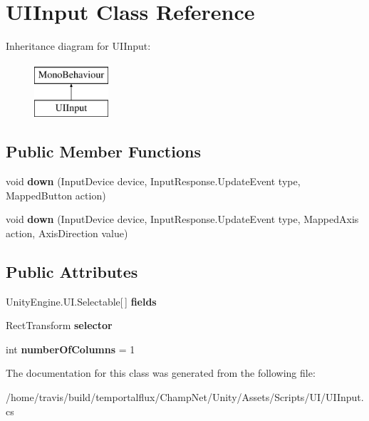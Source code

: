 \hypertarget{class_u_i_input}{\section{U\-I\-Input Class Reference}
\label{class_u_i_input}
}
Inheritance diagram for U\-I\-Input\-:\begin{figure}[H]
\begin{center}
\leavevmode
\includegraphics[height=2.000000cm]{class_u_i_input}
\end{center}
\end{figure}
\subsection*{Public Member Functions}
\begin{DoxyCompactItemize}
\item 
\hypertarget{class_u_i_input_a03c28ad604ce9277ecd348a65704a0a8}{void {\bfseries down} (Input\-Device device, Input\-Response.\-Update\-Event type, Mapped\-Button action)}\label{class_u_i_input_a03c28ad604ce9277ecd348a65704a0a8}

\item 
\hypertarget{class_u_i_input_a9382a2e9ef24947e760e2f28893ac225}{void {\bfseries down} (Input\-Device device, Input\-Response.\-Update\-Event type, Mapped\-Axis action, Axis\-Direction value)}\label{class_u_i_input_a9382a2e9ef24947e760e2f28893ac225}

\end{DoxyCompactItemize}
\subsection*{Public Attributes}
\begin{DoxyCompactItemize}
\item 
\hypertarget{class_u_i_input_a01f1f252f9f819fc1755e0ead2f433c9}{Unity\-Engine.\-U\-I.\-Selectable\mbox{[}$\,$\mbox{]} {\bfseries fields}}\label{class_u_i_input_a01f1f252f9f819fc1755e0ead2f433c9}

\item 
\hypertarget{class_u_i_input_a1e6f61613450b2a3f604558b864dd5fd}{Rect\-Transform {\bfseries selector}}\label{class_u_i_input_a1e6f61613450b2a3f604558b864dd5fd}

\item 
\hypertarget{class_u_i_input_ae73e17d9d0a3dd61ac3580a2263d9536}{int {\bfseries number\-Of\-Columns} = 1}\label{class_u_i_input_ae73e17d9d0a3dd61ac3580a2263d9536}

\end{DoxyCompactItemize}


The documentation for this class was generated from the following file\-:\begin{DoxyCompactItemize}
\item 
/home/travis/build/temportalflux/\-Champ\-Net/\-Unity/\-Assets/\-Scripts/\-U\-I/U\-I\-Input.\-cs\end{DoxyCompactItemize}
